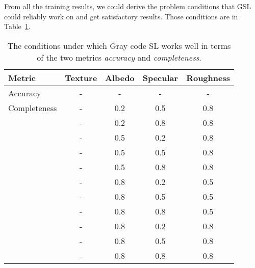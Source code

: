 From all the training results, we could derive the problem conditions that GSL could reliably work on and get satisfactory results. Those conditions are in Table~\ref{tab:sl_traing_result}.
\begin{table}[!htbp]
  \centering
  \begin{tabular}{l*{4}{c}}
  \hline
  \textbf{Metric} & Texture & Albedo & Specular & Roughness\\
  \hline
  Accuracy     & - & - & - & -\\
  \hline\hline
  Completeness & - & 0.2 & 0.5 & 0.8\\
               & - & 0.2 & 0.8 & 0.8\\
               & - & 0.5 & 0.2 & 0.8\\
               & - & 0.5 & 0.5 & 0.8\\
               & - & 0.5 & 0.8 & 0.8\\
               & - & 0.8 & 0.2 & 0.5\\
               & - & 0.8 & 0.5 & 0.5\\
               & - & 0.8 & 0.8 & 0.5\\
               & - & 0.8 & 0.2 & 0.8\\
               & - & 0.8 & 0.5 & 0.8\\
               & - & 0.8 & 0.8 & 0.8\\
  \hline
  \end{tabular}
  \caption{The conditions under which Gray code SL works well in terms of the two metrics \textit{accuracy} and \textit{completeness}.}
  \label{tab:sl_traing_result}
\end{table}

